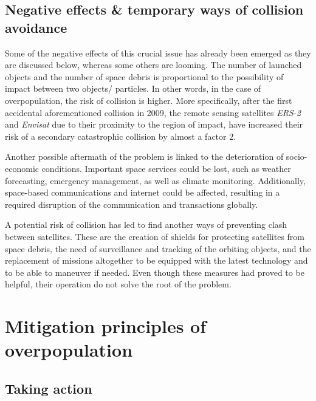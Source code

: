 \bigskip
\subsection{Negative effects \& temporary ways of collision avoidance}
\bigskip

Some of the negative effects of this crucial issue has already been emerged as they are discussed below, whereas some others are looming. The number of launched objects and the number of space debris is proportional to the possibility of impact between two objects/ particles. In other words, in the case of overpopulation, the risk of collision is higher. More specifically, after the first accidental aforementioned collision in 2009, the remote sensing satellites \textit{ERS-2} and \textit{Envisat} due to their proximity to the region of impact, have increased their risk of a secondary catastrophic collision by almost a factor 2. \cite{Klinkrad 2009}

Another possible aftermath of the problem is linked to the deterioration of socio-economic conditions. Important space services could be lost, such as weather forecasting, emergency management, as well as climate monitoring. Additionally, space-based communications and internet could be affected, resulting in a required disruption of the communication and transactions globally. \cite{Undseth}

\bigskip

A potential risk of collision has led to find another ways of preventing clash between satellites. These are the creation of shields for protecting satellites from space debris, the need of surveillance and tracking of the orbiting objects, and the replacement of missions altogether to be equipped with the latest technology and to be able to maneuver if needed. Even though these measures had proved to be helpful, their operation do not solve the root of the problem.


\bigskip
\section{Mitigation principles of overpopulation}
\label{chap:mitigation}
\bigskip

\bigskip
\subsection{Taking action}
\bigskip

